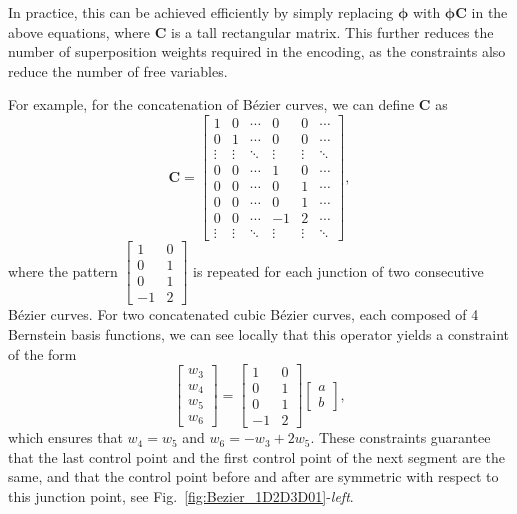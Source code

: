 \documentclass[10pt,a4paper]{article} %
\begin{document}
In practice, this can be achieved efficiently by simply replacing $\bm{\phi}$ with $\bm{\phi}\bm{C}$ in the above equations, where $\bm{C}$ is a tall rectangular matrix. This further reduces the number of superposition weights required in the encoding, as the constraints also reduce the number of free variables. 

For example, for the concatenation of Bézier curves, we can define $\bm{C}$ as
\begin{equation}
	\bm{C} = \begin{bmatrix}
	1 & 0 & \cdots & 0 & 0 & \cdots \\
	0 & 1 & \cdots & 0 & 0 & \cdots \\
	\vdots & \vdots & \ddots & \vdots & \vdots & \ddots \\
	0 & 0 & \cdots & 1 & 0 & \cdots \\
	0 & 0 & \cdots & 0 & 1 & \cdots \\
	0 & 0 & \cdots & 0 & 1 & \cdots \\
	0 & 0 & \cdots & -1 & 2 & \cdots \\
	\vdots & \vdots & \ddots & \vdots & \vdots & \ddots
	\end{bmatrix},
\end{equation}
where the pattern $\begin{bmatrix} 1 & 0 \\ 0 & 1 \\ 0 & 1 \\ -1 & 2 \end{bmatrix}$ is repeated for each junction of two consecutive Bézier curves. For two concatenated cubic Bézier curves, each composed of 4 Bernstein basis functions, we can see locally that this operator yields a constraint of the form
\begin{equation}
	\begin{bmatrix} w_3 \\ w_4 \\ w_5 \\ w_6 \end{bmatrix} =
	\begin{bmatrix} 1 & 0 \\ 0 & 1 \\ 0 & 1 \\ -1 & 2 \end{bmatrix} 
	\begin{bmatrix} a \\ b \end{bmatrix},
\end{equation}
which ensures that $w_4=w_5$ and $w_6=-w_3+2w_5$. These constraints guarantee that the last control point and the first control point of the next segment are the same, and that the control point before and after are symmetric with respect to this junction point, see Fig.~\ref{fig:Bezier_1D2D3D01}-\emph{left}.
\end{document}
